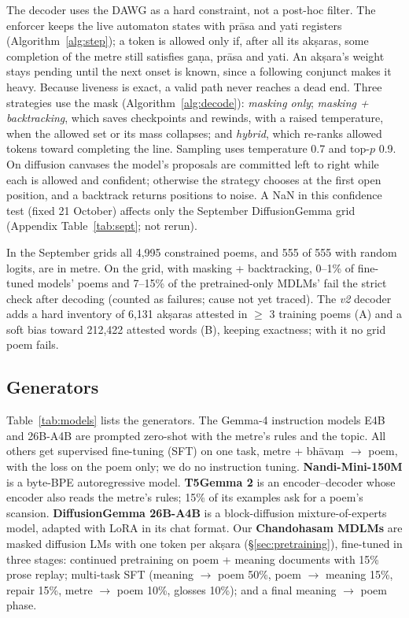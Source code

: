 \documentclass[11pt]{article}
\begin{document}
The decoder uses the DAWG as a hard constraint, not a post-hoc filter. The enforcer keeps the live automaton
states with prāsa and yati registers (Algorithm~\ref{alg:step}); a token is allowed only if, after all its
akṣaras, some completion of the metre still satisfies gaṇa, prāsa and yati. An akṣara's weight stays pending
until the next onset is known, since a following conjunct makes it heavy. Because liveness is exact, a valid
path never reaches a dead end. Three strategies use the mask (Algorithm~\ref{alg:decode}): \emph{masking
only}; \emph{masking + backtracking}, which saves checkpoints and rewinds, with a raised temperature, when the
allowed set or its mass collapses; and \emph{hybrid}, which re-ranks allowed tokens toward completing the
line. Sampling uses temperature 0.7 and top-$p$ 0.9. On diffusion canvases the model's proposals are
committed left to right while each is allowed and confident; otherwise the strategy chooses at the first open
position, and a backtrack returns positions to noise. A NaN in this confidence test (fixed 21 October) affects
only the September DiffusionGemma grid (Appendix Table~\ref{tab:sept}; not rerun).

In the September grids all 4,995 constrained poems, and 555 of 555 with random logits, are in metre. On the grid,
with masking + backtracking, 0--1\% of fine-tuned models' poems and 7--15\% of the pretrained-only MDLMs' fail the
strict check after decoding (counted as failures; cause not yet traced). The \emph{v2} decoder adds a hard inventory
of 6,131 akṣaras attested in $\geq$ 3 training poems (A) and a soft bias toward 212,422 attested words (B),
keeping exactness; with it no grid poem fails.

\subsection{Generators}\label{sec:models}

Table~\ref{tab:models} lists the generators. The Gemma-4 instruction models E4B and 26B-A4B \citep{gemma4_2026} are prompted
zero-shot with the metre's rules and the topic. All others get supervised fine-tuning (SFT) on one task,
metre + bhāvaṃ $\to$ poem, with the loss on the poem only; we do no instruction tuning.
\textbf{Nandi-Mini-150M} \citep{hf_nandi150m} is a byte-BPE autoregressive model. \textbf{T5Gemma 2}
\citep{t5gemma2_2025} is an encoder--decoder whose encoder also reads the metre's rules; 15\% of its examples
ask for a poem's scansion. \textbf{DiffusionGemma 26B-A4B} \citep{hf_diffusiongemma} is a block-diffusion
mixture-of-experts model, adapted with LoRA \citep{hu2022lora} in its chat format. Our \textbf{Chandohasam
MDLMs} are masked diffusion LMs \citep{sahoo2024mdlm} with one token per akṣara (\S\ref{sec:pretraining}),
fine-tuned in three stages: continued pretraining on poem + meaning documents with 15\% prose replay;
multi-task SFT (meaning $\to$ poem 50\%, poem $\to$ meaning 15\%, repair 15\%, metre $\to$ poem 10\%,
glosses 10\%); and a final meaning $\to$ poem phase.
\end{document}
